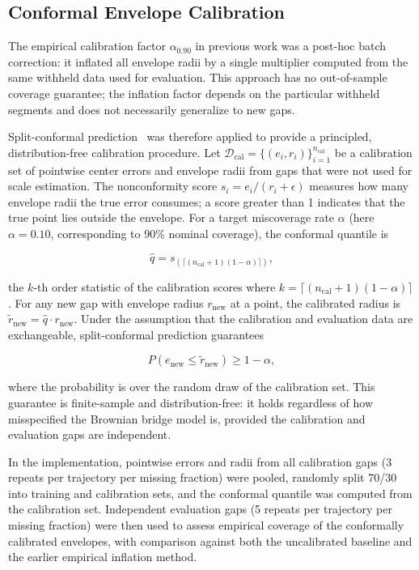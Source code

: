 \documentclass[pdflatex,sn-vancouver-num]{sn-jnl}
\begin{document}
\subsection{Conformal Envelope Calibration}\label{conformal-envelope-calibration}

The empirical calibration factor $\alpha_{0.90}$ in previous work was a post-hoc batch correction: it inflated all envelope radii by a single multiplier computed from the same withheld data used for evaluation. This approach has no out-of-sample coverage guarantee; the inflation factor depends on the particular withheld segments and does not necessarily generalize to new gaps.

Split-conformal prediction~\cite{vovk2005} was therefore applied to provide a principled, distribution-free calibration procedure. Let $\mathcal{D}_{\text{cal}} = \{(e_i, r_i)\}_{i=1}^{n_{\text{cal}}}$ be a calibration set of pointwise center errors and envelope radii from gaps that were not used for scale estimation. The nonconformity score $s_i = e_i / (r_i + \epsilon)$ measures how many envelope radii the true error consumes; a score greater than 1 indicates that the true point lies outside the envelope. For a target miscoverage rate $\alpha$ (here $\alpha = 0.10$, corresponding to 90\% nominal coverage), the conformal quantile is

\[
\hat q = s_{(\lceil (n_{\text{cal}}+1)(1-\alpha) \rceil)},
\]

the $k$-th order statistic of the calibration scores where $k = \lceil (n_{\text{cal}}+1)(1-\alpha) \rceil$. For any new gap with envelope radius $r_{\text{new}}$ at a point, the calibrated radius is $\tilde r_{\text{new}} = \hat q \cdot r_{\text{new}}$. Under the assumption that the calibration and evaluation data are exchangeable, split-conformal prediction guarantees

\[
P(e_{\text{new}} \le \tilde r_{\text{new}}) \ge 1 - \alpha,
\]

where the probability is over the random draw of the calibration set. This guarantee is finite-sample and distribution-free: it holds regardless of how misspecified the Brownian bridge model is, provided the calibration and evaluation gaps are independent.

In the implementation, pointwise errors and radii from all calibration gaps (3 repeats per trajectory per missing fraction) were pooled, randomly split 70/30 into training and calibration sets, and the conformal quantile was computed from the calibration set. Independent evaluation gaps (5 repeats per trajectory per missing fraction) were then used to assess empirical coverage of the conformally calibrated envelopes, with comparison against both the uncalibrated baseline and the earlier empirical inflation method.
\end{document}
